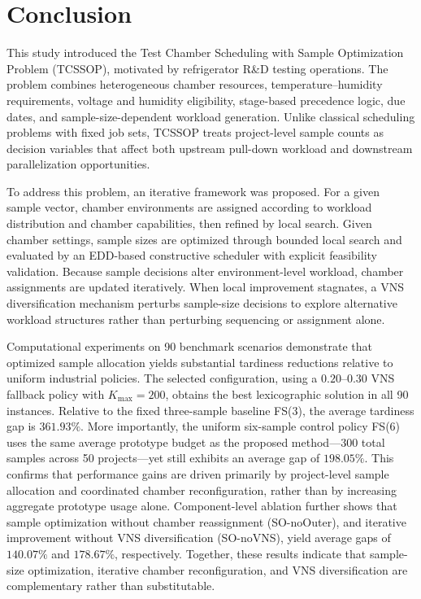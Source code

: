 \documentclass[11pt]{article}
\begin{document}
\section{Conclusion}
\label{sec:conc}

This study introduced the Test Chamber Scheduling with Sample Optimization Problem (TCSSOP), motivated by refrigerator R\&D testing operations. The problem combines heterogeneous chamber resources, temperature--humidity requirements, voltage and humidity eligibility, stage-based precedence logic, due dates, and sample-size-dependent workload generation. Unlike classical scheduling problems with fixed job sets, TCSSOP treats project-level sample counts as decision variables that affect both upstream pull-down workload and downstream parallelization opportunities.

To address this problem, an iterative framework was proposed. For a given sample vector, chamber environments are assigned according to workload distribution and chamber capabilities, then refined by local search. Given chamber settings, sample sizes are optimized through bounded local search and evaluated by an EDD-based constructive scheduler with explicit feasibility validation. Because sample decisions alter environment-level workload, chamber assignments are updated iteratively. When local improvement stagnates, a VNS diversification mechanism perturbs sample-size decisions to explore alternative workload structures rather than perturbing sequencing or assignment alone.

Computational experiments on 90 benchmark scenarios demonstrate that optimized sample allocation yields substantial tardiness reductions relative to uniform industrial policies. The selected configuration, using a \(0.20\)--\(0.30\) VNS fallback policy with \(K_{\max}=200\), obtains the best lexicographic solution in all 90 instances. Relative to the fixed three-sample baseline FS(3), the average tardiness gap is \(361.93\%\). More importantly, the uniform six-sample control policy FS(6) uses the same average prototype budget as the proposed method---300 total samples across 50 projects---yet still exhibits an average gap of \(198.05\%\). This confirms that performance gains are driven primarily by project-level sample allocation and coordinated chamber reconfiguration, rather than by increasing aggregate prototype usage alone. Component-level ablation further shows that sample optimization without chamber reassignment (SO-noOuter), and iterative improvement without VNS diversification (SO-noVNS), yield average gaps of \(140.07\%\) and \(178.67\%\), respectively. Together, these results indicate that sample-size optimization, iterative chamber reconfiguration, and VNS diversification are complementary rather than substitutable.
\end{document}
